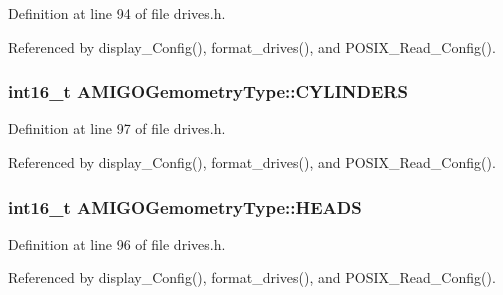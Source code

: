 Definition at line 94 of file drives.\+h.



Referenced by display\+\_\+\+Config(), format\+\_\+drives(), and P\+O\+S\+I\+X\+\_\+\+Read\+\_\+\+Config().

\subsubsection[{\texorpdfstring{C\+Y\+L\+I\+N\+D\+E\+RS}{CYLINDERS}}]{\setlength{\rightskip}{0pt plus 5cm}int16\+\_\+t A\+M\+I\+G\+O\+Gemometry\+Type\+::\+C\+Y\+L\+I\+N\+D\+E\+RS}\hypertarget{structAMIGOGemometryType_a4282aeb6c4aac3b8cfc09e29402dcd3f}{}\label{structAMIGOGemometryType_a4282aeb6c4aac3b8cfc09e29402dcd3f}


Definition at line 97 of file drives.\+h.



Referenced by display\+\_\+\+Config(), format\+\_\+drives(), and P\+O\+S\+I\+X\+\_\+\+Read\+\_\+\+Config().

\subsubsection[{\texorpdfstring{H\+E\+A\+DS}{HEADS}}]{\setlength{\rightskip}{0pt plus 5cm}int16\+\_\+t A\+M\+I\+G\+O\+Gemometry\+Type\+::\+H\+E\+A\+DS}\hypertarget{structAMIGOGemometryType_a33131d3948935e2064af9af151653033}{}\label{structAMIGOGemometryType_a33131d3948935e2064af9af151653033}


Definition at line 96 of file drives.\+h.



Referenced by display\+\_\+\+Config(), format\+\_\+drives(), and P\+O\+S\+I\+X\+\_\+\+Read\+\_\+\+Config().

